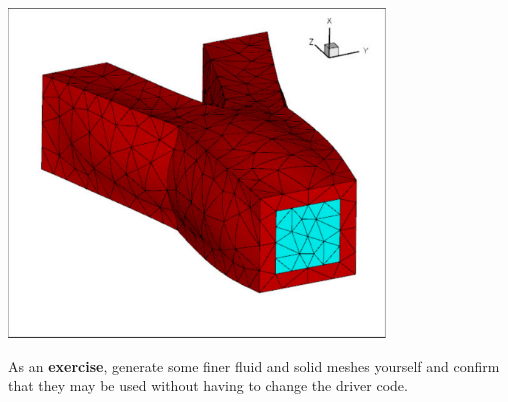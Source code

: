  
\begin{DoxyImage}
\includegraphics[width=0.75\textwidth]{finer_fluid_mesh}
\end{DoxyImage}


As an {\bfseries exercise}, generate some finer fluid and solid meshes yourself and confirm that they may be used without having to change the driver code.



